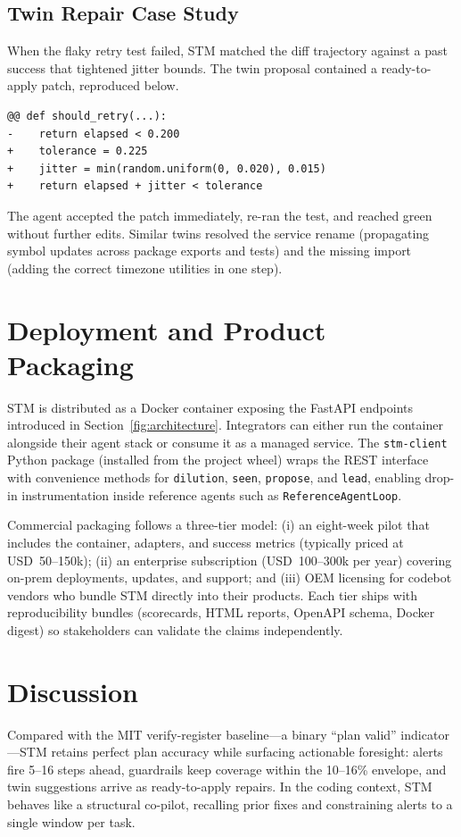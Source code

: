 \documentclass[11pt]{article}
\begin{document}
\subsection{Twin Repair Case Study}
When the flaky retry test failed, STM matched the diff trajectory against a past success that tightened jitter bounds. The twin proposal contained a ready-to-apply patch, reproduced below.

\begin{lstlisting}[style=stm, caption={Twin patch applied during the flaky retry repair.}, label={lst:retry-twin}]
@@ def should_retry(...):
-    return elapsed < 0.200
+    tolerance = 0.225
+    jitter = min(random.uniform(0, 0.020), 0.015)
+    return elapsed + jitter < tolerance
\end{lstlisting}

The agent accepted the patch immediately, re-ran the test, and reached green without further edits. Similar twins resolved the service rename (propagating symbol updates across package exports and tests) and the missing import (adding the correct timezone utilities in one step).

\section{Deployment and Product Packaging}
STM is distributed as a Docker container exposing the FastAPI endpoints introduced in Section~\ref{fig:architecture}. Integrators can either run the container alongside their agent stack or consume it as a managed service. The \texttt{stm-client} Python package (installed from the project wheel) wraps the REST interface with convenience methods for \texttt{dilution}, \texttt{seen}, \texttt{propose}, and \texttt{lead}, enabling drop-in instrumentation inside reference agents such as \texttt{ReferenceAgentLoop}.

Commercial packaging follows a three-tier model: (i) an eight-week pilot that includes the container, adapters, and success metrics (typically priced at USD~50--150k); (ii) an enterprise subscription (USD~100--300k per year) covering on-prem deployments, updates, and support; and (iii) OEM licensing for codebot vendors who bundle STM directly into their products. Each tier ships with reproducibility bundles (scorecards, HTML reports, OpenAPI schema, Docker digest) so stakeholders can validate the claims independently.

\section{Discussion}
Compared with the MIT verify-register baseline---a binary ``plan valid'' indicator---STM retains perfect plan accuracy while surfacing actionable foresight: alerts fire 5--16 steps ahead, guardrails keep coverage within the 10--16\% envelope, and twin suggestions arrive as ready-to-apply repairs. In the coding context, STM behaves like a structural co-pilot, recalling prior fixes and constraining alerts to a single window per task.
\end{document}
